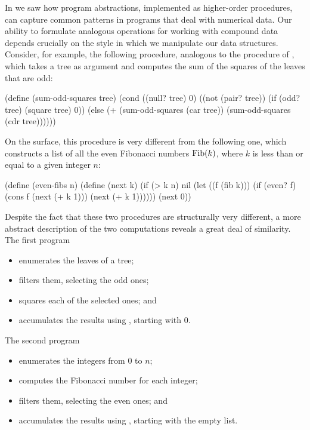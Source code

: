 In  we saw how program abstractions, implemented as
higher-order procedures, can capture common patterns in programs that deal with
numerical data.  Our ability to formulate analogous operations for working with
compound data depends crucially on the style in which we manipulate our data
structures.  Consider, for example, the following procedure, analogous to the
 procedure of , which takes a tree as
argument and computes the sum of the squares of the leaves that are odd:

\begin{codeBlock}
(define (sum-odd-squares tree)
  (cond ((null? tree) 0)
        ((not (pair? tree))
         (if (odd? tree) (square tree) 0))
        (else (+ (sum-odd-squares (car tree))
                 (sum-odd-squares (cdr tree))))))
\end{codeBlock}

\noindent
On the surface, this procedure is very different from the following one, which
constructs a list of all the even Fibonacci numbers \( {\rm Fib}(k) \), where
\( k \) is less than or equal to a given integer \( n \):

\begin{codeBlock}
(define (even-fibs n)
  (define (next k)
    (if (> k n)
        nil
        (let ((f (fib k)))
          (if (even? f)
              (cons f (next (+ k 1)))
              (next (+ k 1))))))
  (next 0))
\end{codeBlock}

\noindent
Despite the fact that these two procedures are structurally very different, a
more abstract description of the two computations reveals a great deal of
similarity.  The first program

\begin{itemize}
\item
enumerates the leaves of a tree;

\item
filters them, selecting the odd ones;

\item
squares each of the selected ones; and

\item
accumulates the results using \code{+}, starting with 0.
\end{itemize}

\noindent
The second program

\begin{itemize}
\item
enumerates the integers from 0 to \( n \);

\item
computes the Fibonacci number for each integer;

\item
filters them, selecting the even ones; and

\item
accumulates the results using ,  starting with the
empty list.
\end{itemize}

